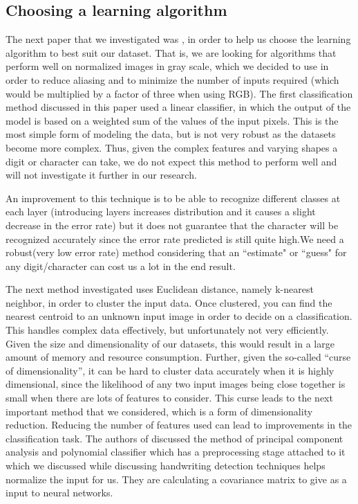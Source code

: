 \documentclass[12pt]{article}  %
\begin{document}
\subsection{Choosing a learning algorithm}
\label{CHOOSING A LEARNING ALGORITHM}
The next paper that we investigated was \cite{digit}, in order to help us choose the learning algorithm to best suit our dataset.  That is, we are looking for algorithms that perform well on normalized images in gray scale, which we decided to use in order to reduce aliasing and to minimize the number of inputs required (which would be multiplied by a factor of three when using RGB).  The first classification method discussed in this paper used a linear classifier, in which the output of the model is based on a weighted sum of the values of the input pixels.  This is the most simple form of modeling the data, but is not very robust as the datasets become more complex.  Thus, given the complex features and varying shapes a digit or character can take, we do not expect this method to perform well and will not investigate it further in our research.  
 
An improvement to this technique is to be able to recognize different classes at each layer (introducing layers increases distribution and it causes a slight decrease in the error rate) but it does not guarantee that the character will be recognized accurately since the error rate predicted is still quite high.We need a robust(very low error rate) method considering that an ``estimate" or ``guess" for any digit/character can cost us a lot in the end result.
 
The next method investigated uses Euclidean distance, namely k-nearest neighbor, in order to cluster the input data.  Once clustered, you can find the nearest centroid to an unknown input image in order to decide on a classification.  This handles complex data effectively, but unfortunately not very efficiently.  Given the size and dimensionality of our datasets, this would result in a large amount of memory and resource consumption.  Further, given the so-called “curse of dimensionality”, it can be hard to cluster data accurately when it is highly dimensional, since the likelihood of any two input images being close together is small when there are lots of features to consider. This curse leads to the next important method that we considered, which is a form of dimensionality reduction.  Reducing the number of features used can lead to improvements in the classification task. The authors of \cite{digit} discussed the method of principal component analysis and polynomial classifier which has a preprocessing stage attached to it which we discussed while discussing handwriting detection techniques helps normalize the input for us. They are calculating a covariance matrix to give as a input to neural networks.
\end{document}

